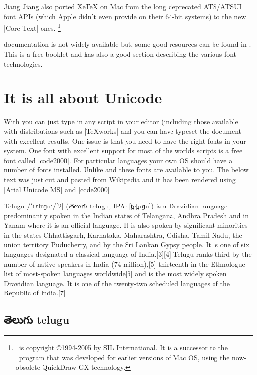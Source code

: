 Jiang Jiang also ported XeTeX on Mac from the long deprecated ATS/ATSUI font APIs (which Apple didn’t even provide on their 64-bit systems) to the new |Core Text| ones.
\footnote{\XeTeX\ is copyright ©1994-2005 by SIL International. It is a successor to the \TeXgX\ program that was developed for earlier versions of Mac OS, using the now-obsolete QuickDraw GX technology.}

\XeTeX documentation is not widely available but, some good resources can be found in \citep{xetexcompanion}. This is a free booklet and has also a good section describing the various font technologies.

\section{It is all about Unicode}

With \XeLaTeX you can just type in any script in your editor (including those available with \tex distributions such as |TeXworks| and you can have \XeLaTeX typeset the document with excellent results. One issue is that you need to have the right fonts in your system. One font with excellent support for most of the worlds scripts is a free font called |code2000|. For particular languages your own OS should have a number of fonts installed. Unlike \tex and \latexe these fonts are available to you. The below text was just cut and pasted from Wikipedia and it has been rendered using |Arial Unicode MS| and |code2000|





Telugu /ˈtɛlʉɡuː/[2] (తెలుగు telugu, IPA: [t̪el̪uɡu]) is a Dravidian language predominantly spoken in the Indian states of Telangana, Andhra Pradesh and in Yanam where it is an official language. It is also spoken by significant minorities in the states Chhattisgarh, Karnataka, Maharashtra, Odisha, Tamil Nadu, the union territory Puducherry, and by the Sri Lankan Gypsy people. It is one of six languages designated a classical language of India.[3][4] Telugu ranks third by the number of native speakers in India (74 million),[5] thirteenth in the Ethnologue list of most-spoken languages worldwide[6] and is the most widely spoken Dravidian language. It is one of the twenty-two scheduled languages of the Republic of India.[7]




\subsection{\protect\telugufam   తెలుగు telugu}

